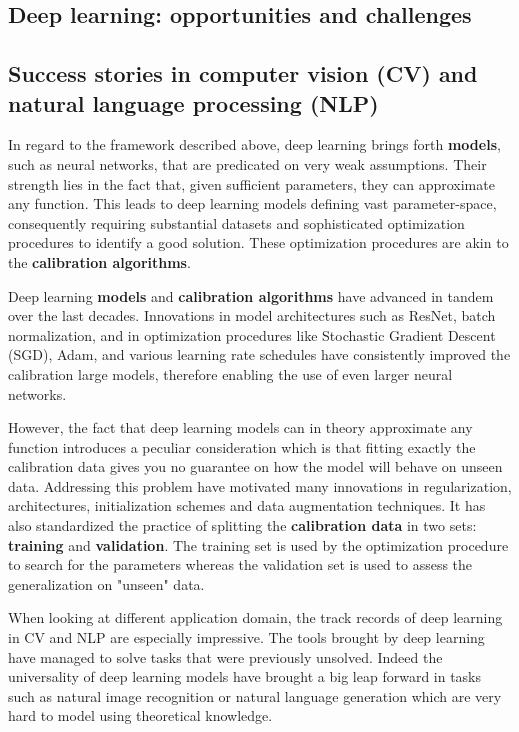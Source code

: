 \begin{bibunit}
% 

\section{Deep learning: opportunities and challenges}

\subsection*{Success stories in computer vision (CV) and natural language processing (NLP)}

In regard to the framework described above, deep learning brings forth \textbf{models}, such as neural networks, that are predicated on very weak assumptions. Their strength lies in the fact that, given sufficient parameters, they can approximate any function\cite{hornikMultilayerFeedforwardNetworks1989}. This leads to deep learning models defining vast parameter-space, consequently requiring substantial datasets and sophisticated optimization procedures to identify a good solution. These optimization procedures are akin to the \textbf{calibration algorithms}.

Deep learning \textbf{models} and \textbf{calibration algorithms} have advanced in tandem over the last decades.
Innovations in model architectures such as ResNet\cite{heDeepResidualLearning2016}, batch normalization\cite{ioffeBatchNormalizationAccelerating2015}, and in optimization procedures like Stochastic Gradient Descent (SGD)\cite{summaLargeScaleMachineLearning2011}, Adam\cite{kingmaAdamMethodStochastic2017}, and various learning rate schedules have consistently improved the calibration large models, therefore enabling the use of even larger neural networks. 

However, the fact that deep learning models can in theory approximate any function introduces a peculiar consideration which is that fitting exactly the calibration data gives you no guarantee on how the model will behave on unseen data.
Addressing this problem have motivated many innovations in regularization, architectures, initialization schemes and data augmentation techniques.
It has also standardized the practice of splitting the \textbf{calibration data} in two sets: \textbf{training} and \textbf{validation}.
The training set is used by the optimization procedure to search for the parameters whereas the validation set is used to assess the generalization on "unseen" data.

When looking at different application domain, the track records of deep learning in CV\cite{chaiDeepLearningComputer2021} and NLP\cite{brownLanguageModelsAre2020} are especially impressive. 
The tools brought by deep learning have managed to solve tasks that were previously unsolved.
Indeed the universality of deep learning models have brought a big leap forward in tasks such as natural image recognition or natural language generation which are very hard to model using theoretical knowledge.


\end{bibunit}
